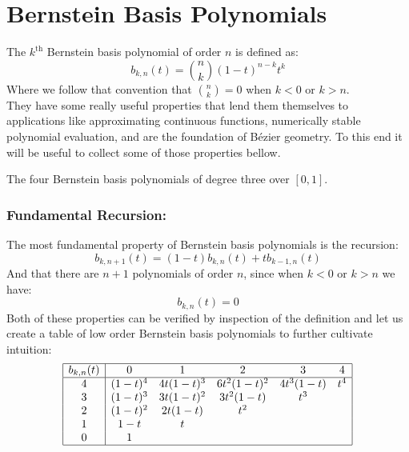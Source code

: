 
\section{Bernstein Basis Polynomials}
The $k^\text{th}$ Bernstein basis polynomial of order $n$ is defined as:
\[
	b_{k,n}(t) = \binom{n}{k}(1-t)^{n-k}t^k
\]
Where we follow that convention that $\binom{n}{k}=0$ when $k<0$ or $k>n$.
\\

They have some really useful properties that lend them themselves to applications like
approximating continuous functions,
numerically stable polynomial evaluation, 
and are the foundation of Bézier geometry.
To this end it will be useful to collect some of those properties bellow.
\begin{center}

The four Bernstein basis polynomials of degree three over $[0,1]$.
\end{center}

\subsubsection{Fundamental Recursion:}
The most fundamental property of Bernstein basis polynomials is the recursion:
\[b_{k,n+1}(t) = (1-t)b_{k,n}(t)+tb_{k-1,n}(t)\]
And that there are $n+1$ polynomials of order $n$,
since when $k<0$ or $k>n$ we have:
\[b_{k,n}(t) = 0\]
Both of these properties can be verified by inspection of the definition and let us create a table of low order Bernstein basis polynomials to further cultivate intuition:
\[
\begin{array}{|c|ccccc|}
	\hline
	b_{k,n}(t)&0&1&2&3&4\\
	\hline
	4&(1-t)^4&4t(1-t)^3&6t^2(1-t)^2&4t^3(1-t)&t^4\\
	3&(1-t)^3&3t(1-t)^2&3t^2(1-t)&t^3&\\
	2&(1-t)^2&2t(1-t)&t^2&&\\
	1&1-t&t&&&\\
	0&1&&&&\\
	\hline
\end{array}
\]

